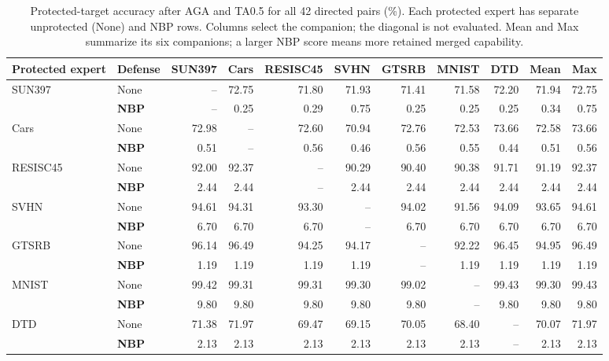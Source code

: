 \begin{table}[!t]
\centering
\small
\setlength{\tabcolsep}{3pt}
\caption{Protected-target accuracy after AGA and TA0.5 for all 42 directed pairs (\%). Each protected expert has separate unprotected (None) and NBP rows. Columns select the companion; the diagonal is not evaluated. Mean and Max summarize its six companions; a larger NBP score means more retained merged capability.}
\label{tab:pair-target}
\begin{tabular}{llrrrrrrrrr}
\toprule
Protected expert & Defense & SUN397 & Cars & RESISC45 & SVHN & GTSRB & MNIST & DTD & Mean & Max \\
\midrule
\multirow{2}{*}{SUN397} & None & -- & 72.75 & 71.80 & 71.93 & 71.41 & 71.58 & 72.20 & 71.94 & 72.75 \\
 & \textbf{NBP} & -- & 0.25 & 0.29 & 0.75 & 0.25 & 0.25 & 0.25 & 0.34 & 0.75 \\
\midrule
\multirow{2}{*}{Cars} & None & 72.98 & -- & 72.60 & 70.94 & 72.76 & 72.53 & 73.66 & 72.58 & 73.66 \\
 & \textbf{NBP} & 0.51 & -- & 0.56 & 0.46 & 0.56 & 0.55 & 0.44 & 0.51 & 0.56 \\
\midrule
\multirow{2}{*}{RESISC45} & None & 92.00 & 92.37 & -- & 90.29 & 90.40 & 90.38 & 91.71 & 91.19 & 92.37 \\
 & \textbf{NBP} & 2.44 & 2.44 & -- & 2.44 & 2.44 & 2.44 & 2.44 & 2.44 & 2.44 \\
\midrule
\multirow{2}{*}{SVHN} & None & 94.61 & 94.31 & 93.30 & -- & 94.02 & 91.56 & 94.09 & 93.65 & 94.61 \\
 & \textbf{NBP} & 6.70 & 6.70 & 6.70 & -- & 6.70 & 6.70 & 6.70 & 6.70 & 6.70 \\
\midrule
\multirow{2}{*}{GTSRB} & None & 96.14 & 96.49 & 94.25 & 94.17 & -- & 92.22 & 96.45 & 94.95 & 96.49 \\
 & \textbf{NBP} & 1.19 & 1.19 & 1.19 & 1.19 & -- & 1.19 & 1.19 & 1.19 & 1.19 \\
\midrule
\multirow{2}{*}{MNIST} & None & 99.42 & 99.31 & 99.31 & 99.30 & 99.02 & -- & 99.43 & 99.30 & 99.43 \\
 & \textbf{NBP} & 9.80 & 9.80 & 9.80 & 9.80 & 9.80 & -- & 9.80 & 9.80 & 9.80 \\
\midrule
\multirow{2}{*}{DTD} & None & 71.38 & 71.97 & 69.47 & 69.15 & 70.05 & 68.40 & -- & 70.07 & 71.97 \\
 & \textbf{NBP} & 2.13 & 2.13 & 2.13 & 2.13 & 2.13 & 2.13 & -- & 2.13 & 2.13 \\
\bottomrule
\end{tabular}
\end{table}
